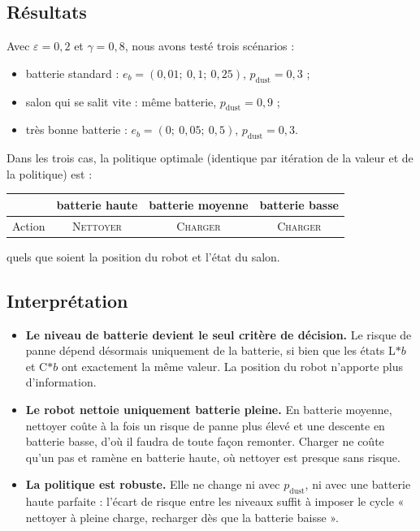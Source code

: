 \documentclass[11pt,a4paper]{article}
\newcommand{\N}{\textsc{Nettoyer}}
\newcommand{\C}{\textsc{Charger}}
\newcommand{\pd}{p_{\text{dust}}}
\begin{document}
\subsection{Résultats}

Avec $\varepsilon = 0{,}2$ et $\gamma = 0{,}8$, nous avons testé trois scénarios :
\begin{itemize}
  \item batterie standard : $e_b = (0{,}01;\ 0{,}1;\ 0{,}25)$, $\pd = 0{,}3$ ;
  \item salon qui se salit vite : même batterie, $\pd = 0{,}9$ ;
  \item très bonne batterie : $e_b = (0;\ 0{,}05;\ 0{,}5)$, $\pd = 0{,}3$.
\end{itemize}

Dans les trois cas, la politique optimale (identique par itération de la valeur et de la politique) est :
\begin{center}
\begin{tabular}{l c c c}
\toprule
& batterie haute & batterie moyenne & batterie basse \\
\midrule
Action & \N & \C & \C \\
\bottomrule
\end{tabular}
\end{center}
quels que soient la position du robot et l'état du salon.

\subsection{Interprétation}

\begin{itemize}
  \item \textbf{Le niveau de batterie devient le seul critère de décision.} Le risque de panne dépend désormais
        uniquement de la batterie, si bien que les états L$\ast b$ et C$\ast b$ ont exactement la même valeur.
        La position du robot n'apporte plus d'information.
  \item \textbf{Le robot nettoie uniquement batterie pleine.} En batterie moyenne, nettoyer coûte à la fois un
        risque de panne plus élevé et une descente en batterie basse, d'où il faudra de toute façon remonter.
        Charger ne coûte qu'un pas et ramène en batterie haute, où nettoyer est presque sans risque.
  \item \textbf{La politique est robuste.} Elle ne change ni avec $\pd$, ni avec une batterie haute parfaite :
        l'écart de risque entre les niveaux suffit à imposer le cycle « nettoyer à pleine charge, recharger dès que la
        batterie baisse ».
\end{itemize}
\end{document}
